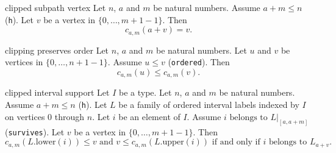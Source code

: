 \begin{cleanresult}{clipped subpath vertex}
Let $n$, $a$ and $m$ be natural numbers.
Assume $a + m \le n$ (\texttt{h}).
Let $v$ be a vertex in $\{0,\ldots,m + 1-1\}$.
Then \[c_{a,m}(a+v) = v.\]
\end{cleanresult}

\begin{cleanresult}{clipping preserves order}
Let $n$, $a$ and $m$ be natural numbers.
Let $u$ and $v$ be vertices in $\{0,\ldots,n + 1-1\}$.
Assume $u \le v$ (\texttt{ordered}).
Then \[c_{a,m}(u) \le c_{a,m}(v).\]
\end{cleanresult}

\begin{cleanresult}{clipped interval support}
Let $I$ be a type.
Let $n$, $a$ and $m$ be natural numbers.
Assume $a + m \le n$ (\texttt{h}).
Let $L$ be a family of ordered interval labels indexed by $I$ on vertices $0$ through $n$.
Let $i$ be an element of $I$.
Assume $i \text{ belongs to } L|_{[a,a+m]}$ (\texttt{survives}).
Let $v$ be a vertex in $\{0,\ldots,m + 1-1\}$.
Then \[c_{a,m}(L.\mathrm{lower}(i)) \le v \text{ and } v \le c_{a,m}(L.\mathrm{upper}(i)) \text{ if and only if } i \text{ belongs to } L_{a+v}.\]
\end{cleanresult}

